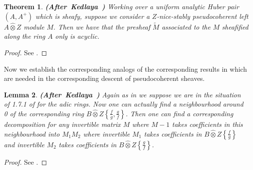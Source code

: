 \documentclass[12pt]{amsart}
\newtheorem{theorem}{Theorem}[section]
\newtheorem{lemma}[theorem]{Lemma}
\theoremstyle{definition}
\numberwithin{equation}{section}
\begin{document}
\begin{theorem} \mbox{\bf{(After Kedlaya \cite[Corollary 1.9.8]{Ked2})}}
Working over a uniform analytic Huber pair $(A,A^+)$ which is sheafy, suppose we consider a $Z$-nice-stably pseudocoherent left $A\widehat{\otimes}Z$ module $M$. Then we have that the presheaf $\widetilde{M}$ associated to the $M$ sheafified along the ring $A$ only is acyclic.
	
\end{theorem}


\begin{proof}
See \cite[Corollary 1.9.8]{Ked2}.	
\end{proof}



\indent Now we establish the corresponding analogs of the corresponding results in \cite{Ked2} which are needed in the corresponding descent of pseudocoherent sheaves.



\begin{lemma}\mbox{\bf{(After Kedlaya \cite[Lemma 1.9.9]{Ked2})}}
Again as in \cite[Lemma 1.9.9]{Ked2} we suppose we are in the situation of 1.7.1 of \cite{Ked2} for the adic rings. Now one can actually find a neighbourhood around 0 of the corresponding ring $B\widehat{\otimes}Z\left\{\frac{f}{g},\frac{g}{f}\right\}$. Then one can find a corresponding decomposition for any invertible matrix $M$ where $M-1$ takes coefficients in this neighbourhood into $M_1M_2$ where invertible $M_1$ takes coefficients in $B\widehat{\otimes}Z\left\{\frac{f}{g}\right\}$ and invertible $M_2$ takes coefficients in $B\widehat{\otimes}Z\left\{\frac{g}{f}\right\}$. 
\end{lemma}


\begin{proof}
See \cite[Lemma 1.9.9]{Ked2}.	
\end{proof}


\end{document}
